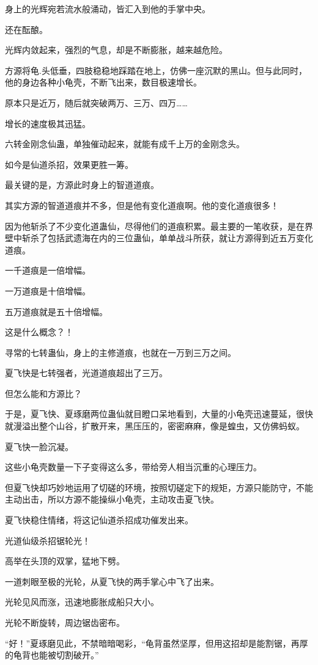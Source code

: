 \begin{this_body}
身上的光辉宛若流水般涌动，皆汇入到他的手掌中央。

还在酝酿。

光辉内敛起来，强烈的气息，却是不断膨胀，越来越危险。

方源将龟.头低垂，四肢稳稳地踩踏在地上，仿佛一座沉默的黑山。但与此同时，他的身边各种小龟壳，不断飞出来，数目极速增长。

原本只是近万，随后就突破两万、三万、四万……

增长的速度极其迅猛。

六转金刚念仙蛊，单独催动起来，就能有成千上万的金刚念头。

如今是仙道杀招，效果更胜一筹。

最关键的是，方源此时身上的智道道痕。

其实方源的智道道痕并不多，但是他有变化道痕啊。他的变化道痕很多！

因为他斩杀了不少变化道蛊仙，尽得他们的道痕积累。最主要的一笔收获，是在界壁中斩杀了包括武遗海在内的三位蛊仙，单单战斗所获，就让方源得到近五万变化道痕。

一千道痕是一倍增幅。

一万道痕是十倍增幅。

五万道痕就是五十倍增幅。

这是什么概念？！

寻常的七转蛊仙，身上的主修道痕，也就在一万到三万之间。

夏飞快是七转强者，光道道痕超出了三万。

但怎么能和方源比？

于是，夏飞快、夏琢磨两位蛊仙就目瞪口呆地看到，大量的小龟壳迅速蔓延，很快就漫溢出整个山谷，扩散开来，黑压压的，密密麻麻，像是蝗虫，又仿佛蚂蚁。

夏飞快一脸沉凝。

这些小龟壳数量一下子变得这么多，带给旁人相当沉重的心理压力。

但夏飞快却巧妙地运用了切磋的环境，按照切磋定下的规矩，方源只能防守，不能主动出击，所以方源不能操纵小龟壳，主动攻击夏飞快。

夏飞快稳住情绪，将这记仙道杀招成功催发出来。

光道仙级杀招锯轮光！

高举在头顶的双掌，猛地下劈。

一道刺眼至极的光轮，从夏飞快的两手掌心中飞了出来。

光轮见风而涨，迅速地膨胀成船只大小。

光轮不断旋转，周边锯齿密布。

“好！”夏琢磨见此，不禁暗暗喝彩，“龟背虽然坚厚，但用这招却是能割锯，再厚的龟背也能被切割破开。”


\end{this_body}
